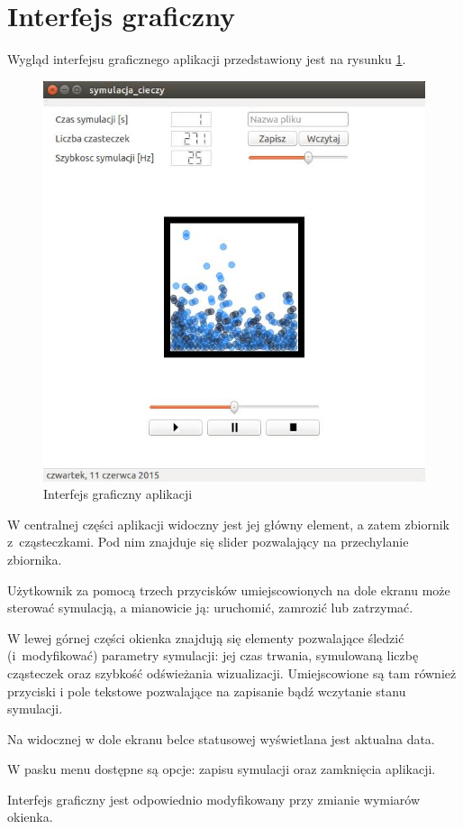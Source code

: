 
\section{Interfejs graficzny}
Wygląd interfejsu graficznego aplikacji przedstawiony jest na rysunku \ref{fig:gui}.

\begin{figure}
 \begin{center} 
  \includegraphics{./rysunki/new_gui.jpeg} 
 \end{center}
 \caption{Interfejs graficzny aplikacji}
 \label{fig:gui} 
\end{figure}

W centralnej części aplikacji widoczny jest jej główny element, a zatem zbiornik z~cząsteczkami. Pod nim znajduje się slider pozwalający na przechylanie zbiornika.

Użytkownik za pomocą trzech przycisków umiejscowionych na dole ekranu może sterować symulacją, a mianowicie ją: uruchomić, zamrozić lub zatrzymać.  

W lewej górnej części okienka znajdują się elementy pozwalające śledzić (i~modyfikować) parametry symulacji: jej czas trwania, symulowaną liczbę cząsteczek oraz szybkość odświeżania wizualizacji. Umiejscowione są tam również przyciski i pole tekstowe pozwalające na zapisanie bądź wczytanie stanu symulacji.

Na widocznej w dole ekranu belce statusowej wyświetlana jest aktualna data.

W pasku menu dostępne są opcje: zapisu symulacji oraz zamknięcia aplikacji.

Interfejs graficzny jest odpowiednio modyfikowany przy zmianie wymiarów okienka.